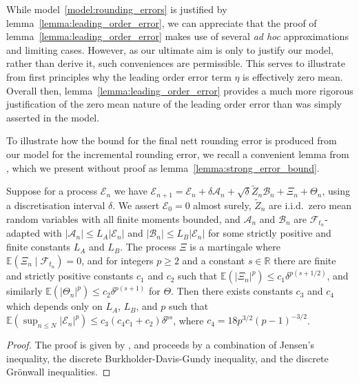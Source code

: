 \documentclass[manuscript,review]{acmart}
\begin{document}
While model~\ref{model:rounding_errors} is justified by lemma~\ref{lemma:leading_order_error}, we can appreciate that the proof of lemma~\ref{lemma:leading_order_error} makes use of several \textit{ad hoc} approximations and limiting cases. However, as our ultimate aim is only to justify our model, rather than derive it, such conveniences are permissible. This serves to illustrate from first principles why the leading order error term $ \eta $ is effectively zero mean. Overall then, lemma~\ref{lemma:leading_order_error} provides a much more rigorous justification of the zero mean nature of the leading order error than was simply asserted in the  \citet{arciniega2003rounding} model. 

To illustrate how the bound for the final nett rounding error is produced from our model for the incremental rounding error, we recall a convenient lemma from \citeauthor{giles2020approximate} \citep[lemma~4.3]{giles2020approximate} \citep[lemma~5.2.3]{sheridan2020nested}, which we present without proof as lemma~\ref{lemma:strong_error_bound}.

\begin{lemma}
\label{lemma:strong_error_bound}
Suppose for a process $ \mathcal{E}_n $ we have 
$ \mathcal{E}_{n+1} = \mathcal{E}_n + \delta \mathcal{A}_n + \sqrt{\delta} \widetilde{Z}_n \mathcal{B}_n + \Xi_n + \Theta_n $,
using a discretisation interval $ \delta $. 
We assert $ \mathcal{E}_0 = 0 $ almost surely, $ \widetilde{Z}_n $ are i.i.d.\ zero mean random variables with all finite moments bounded, and $ \mathcal{A}_n $ and $ \mathcal{B}_n $ are $ \mathcal{F}_{t_n} $-adapted with $ \lvert \mathcal{A}_n\rvert \leq L_A \lvert \mathcal{E}_n\rvert  $ and $ \lvert \mathcal{B}_n\rvert \leq L_B \lvert \mathcal{E}_n\rvert  $ for some strictly positive and finite constants $ L_A $ and $ L_B $. The process $ \Xi $ is a martingale where $ \mathbb{E}(\Xi_n\mid\mathcal{F}_{t_n}) = 0 $, and for integers $ p \geq 2 $  and a constant $ s \in \mathbb{R} $ there are finite and strictly positive constants $ c_1 $ and $ c_2 $ such that $ \mathbb{E}(\lvert\Xi_n\rvert^p) \leq c_1 \delta^{p(s + 1/2)} $, and similarly $ \mathbb{E}(\lvert\Theta_n\rvert^p) \leq c_2 \delta^{p(s + 1)} $ for $ \Theta $. Then there exists constants $ c_3 $ and $ c_4 $ which depends only on $ L_A $, $ L_B $, and $ p $ such that 
$ \mathbb{E}(\sup_{n \leq N} \lvert\mathcal{E}_n\rvert^p) \leq c_3(c_4 c_1 + c_2)\delta^{ps} $, 
where $ c_4 = 18p^{3/2}(p - 1)^{-3/2} $.
\end{lemma}

\begin{proof}
The proof is given by \citeauthor{giles2020approximate} \citep[lemma~4.3]{giles2020approximate} \citep[lemma~5.2.3]{sheridan2020nested}, and proceeds by a combination of Jensen's inequality, the discrete Burkholder-Davis-Gundy inequality, and the discrete Gr\"{o}nwall inequalities. \qedhere
\end{proof}
\end{document}

